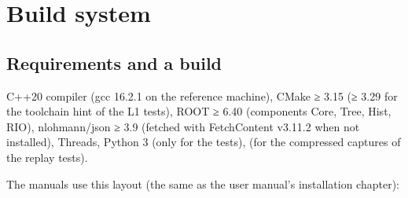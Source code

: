 \chapter{\texorpdfstring{Build system}{Build system}}\label{developer_manual-02u5fbuild}
\section{\texorpdfstring{Requirements and a build}{Requirements and a build}}\label{developer_manual-02u5fbuild:21-requirements-and-a-build}
C++20 compiler (gcc 16.2.1 on the reference machine), CMake ≥ 3.15 (≥ 3.29 for the toolchain hint of the L1 tests),
ROOT ≥ 6.40 (components Core, Tree, Hist, RIO), nlohmann/\allowbreak{}json ≥ 3.9 (fetched with FetchContent v3.11.2 when not
installed), Threads, Python 3 (only for the  tests),  (for the compressed captures of the replay tests).

The manuals use this layout (the same as the user manual's installation chapter):


